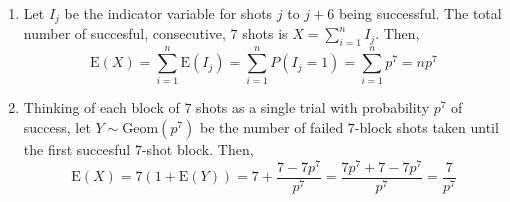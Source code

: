\begin{enumerate}[label=(\alph*)]
\item Let $I_{j}$ be the indicator variable for shots $j$ to $j+6$ being
successful. The total number of succesful, consecutive, $7$ shots is $X = \sum_
{i=1}^{n}I_{j}$. Then, $$\text{E}(X) = \sum_{i=1}^{n}\text{E}(I_{j}) = \sum_
{i=1}^{n}P(I_{j}=1) = \sum_{i=1}^{n}p^{7} = np^{7}$$

\item Thinking of each block of $7$ shots as a single trial with probability $p^
{7}$ of success, let $Y \sim \text{Geom}(p^{7})$ be the number of
failed $7$-block shots taken until the first succesful $7$-shot block. Then, $$
\text{E}(X) = 7(1 + \text{E}(Y)) = 7 + \frac{7-7p^{7}}{p^{7}} = \frac{7p^{7} + 7
- 7p^{7}}{p^{7}} = \frac{7}{p^{7}}$$
\end{enumerate}